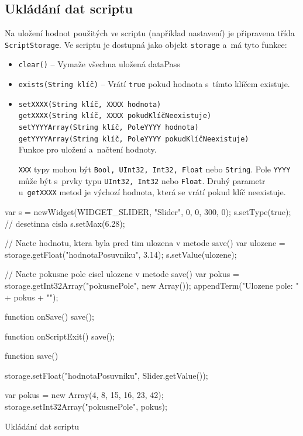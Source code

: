 \documentclass[12pt, a4paper, oneside]{article}
\begin{document}
\newpage
\subsection*{Ukládání dat scriptu}
Na uložení hodnot použitých ve scriptu (například nastavení) je připravena třída \verb|ScriptStorage|. Ve scriptu je dostupná jako objekt \verb|storage| a~má tyto funkce:
\begin{itemize}
    \item {\color{blue}\verb/clear()/} -- Vymaže všechna uložená dataPass
    \item {\color{blue}\verb/exists(String klíč)/} -- Vrátí \verb|true| pokud hodnota s~tímto klíčem existuje.
    \item {\color{blue}\verb/setXXXX(String klíč, XXXX hodnota)/} \\
        {\color{blue}\verb/getXXXX(String klíč, XXXX pokudKlíčNeexistuje)/} \\
        {\color{blue}\verb/setYYYYArray(String klíč, PoleYYYY hodnota)/} \\
        {\color{blue}\verb/getYYYYArray(String klíč, PoleYYYY pokudKlíčNeexistuje)/} \\
            Funkce pro uložení a~načtení hodnoty.

        \verb|XXX| typy mohou být \verb|Bool, UInt32, Int32, Float| nebo \verb|String|. Pole \verb|YYYY| může být s~prvky typu \verb|UInt32, Int32| nebo \verb|Float|. Druhý parametr u~\verb|getXXXX| metod je výchozí hodnota, která se vrátí pokud klíč neexistuje.
\end{itemize}

\begin{listing}[H]
\begin{jscode}
var s = newWidget(WIDGET_SLIDER, "Slider", 0, 0, 300, 0);
s.setType(true); // desetinna cisla
s.setMax(6.28);

// Nacte hodnotu, ktera byla pred tim ulozena v metode save()
var ulozene = storage.getFloat("hodnotaPosuvniku", 3.14);
s.setValue(ulozene);

// Nacte pokusne pole cisel ulozene v metode save()
var pokus = storage.getInt32Array("pokusnePole", new Array());
appendTerm("Ulozene pole: " + pokus + "\n");

function onSave() {
    save();
}

function onScriptExit() {
    save();
}

function save() {
    storage.setFloat("hodnotaPosuvniku", Slider.getValue());

    var pokus = new Array(4, 8, 15, 16, 23, 42);
    storage.setInt32Array("pokusnePole", pokus);
}
\end{jscode}
\caption{Ukládání dat scriptu}
\end{listing}
\end{document}
